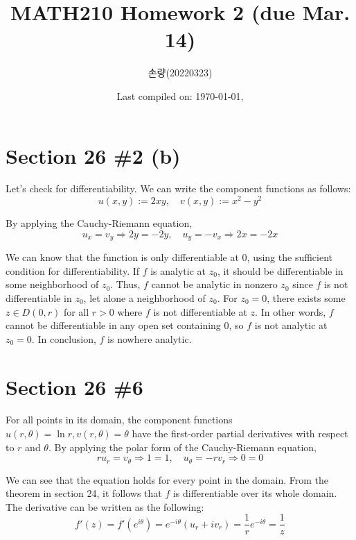 \documentclass{scrartcl}
\title{MATH210 Homework 2 (due Mar. 14)}
\author{손량(20220323)}
\date{Last compiled on: \today, \currenttime}
\begin{document}
\maketitle

\section{Section 26 \#2 (b)}
Let's check for differentiability.
We can write the component functions as follows:
\[
  u(x, y) := 2xy, \quad v(x, y) := x^2 - y^2
\]

By applying the Cauchy-Riemann equation,
\[
  u_x = v_y \Longrightarrow 2y = -2y, \quad u_y = -v_x \Longrightarrow 2x = -2x
\]

We can know that the function is only differentiable at \(0\), using the sufficient condition for differentiability.
If \(f\) is analytic at \(z_0\), it should be differentiable in some neighborhood of \(z_0\).
Thus, \(f\) cannot be analytic in nonzero \(z_0\) since \(f\) is not differentiable in \(z_0\), let alone a neighborhood of \(z_0\).
For \(z_0 = 0\), there exists some \(z \in D(0, r)\) for all \(r > 0\) where \(f\) is not differentiable at \(z\).
In other words, \(f\) cannot be differentiable in any open set containing \(0\), so \(f\) is not analytic at \(z_0 = 0\).
In conclusion, \(f\) is nowhere analytic.

\section{Section 26 \#6}
For all points in its domain, the component functions \(u(r, \theta) = \ln r, v(r, \theta) = \theta\) have the first-order partial derivatives with respect to \(r\) and \(\theta\).
By applying the polar form of the Cauchy-Riemann equation,
\[
  ru_r = v_\theta \Longrightarrow 1 = 1, \quad u_\theta = -rv_r \Longrightarrow 0 = 0
\]

We can see that the equation holds for every point in the domain.
From the theorem in section 24, it follows that \(f\) is differentiable over its whole domain.
The derivative can be written as the following:
\[
  f'(z) = f'(e^{i\theta}) = e^{-i\theta} (u_r + iv_r) = \frac{1}{r} e^{-i\theta} = \frac{1}{z}
\]
\end{document}
